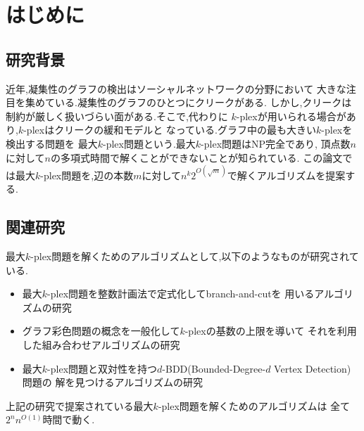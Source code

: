\documentclass{thesis}
\theoremstyle{definition}
\begin{document}
\baselineskip=22pt
\pagestyle{empty}

\maketitle

\pagestyle{myheadings}	%
\tableofcontents

\newpage


\chapter{はじめに}

\section{研究背景}
近年,凝集性のグラフの検出はソーシャルネットワークの分野において
大きな注目を集めている.凝集性のグラフのひとつにクリークがある.
しかし,クリークは制約が厳しく扱いづらい面がある.そこで,代わりに
$k$-plexが用いられる場合があり,$k$-plexはクリークの緩和モデルと
なっている.グラフ中の最も大きい$k$-plexを検出する問題を
最大$k$-plex問題という.最大$k$-plex問題はNP完全であり,
頂点数$n$に対して$n$の多項式時間で解くことができないことが知られている.
この論文では最大$k$-plex問題を,辺の本数$m$に対して$n^{k }2^{O(\sqrt{m})}$で解くアルゴリズムを提案する.

\section{関連研究}
最大$k$-plex問題を解くためのアルゴリズムとして,以下のようなものが研究されている.
\begin{itemize}
 \item 最大$k$-plex問題を整数計画法で定式化してbranch-and-cutを
	用いるアルゴリズムの研究 \cite{balasundaram2011clique}
 \item グラフ彩色問題の概念を一般化して$k$-plexの基数の上限を導いて
	それを利用した組み合わせアルゴリズムの研究 \cite{mcclosky2012combinatorial}
 \item 最大$k$-plex問題と双対性を持つ$d$-BDD(Bounded-Degree-$d$ Vertex Detection)問題の
	解を見つけるアルゴリズムの研究 \cite{moser2012exact}
\end{itemize}
上記の研究で提案されている最大$k$-plex問題を解くためのアルゴリズムは
全て$2^{n}n^{O(1)}$時間で動く.
\end{document}
